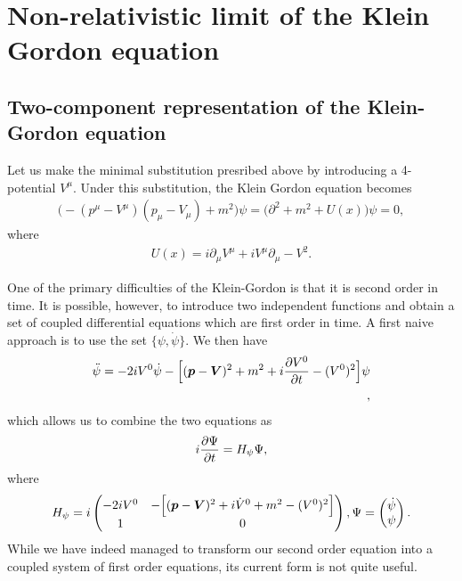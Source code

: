 \section{Non-relativistic limit of the Klein Gordon equation}
\label{sec:nr-limit-of-the-kg-equation}


\subsection{Two-component representation of the Klein-Gordon equation}

Let us make the minimal substitution presribed above by introducing a 4-potential $V^{\mu}$.
Under this substitution, the Klein Gordon equation becomes
\begin{align}
    \Big( - ( p^{\mu} - V^{\mu} ) ( p_{\mu} - V_{\mu} ) + m^2 \Big) \psi = \Big( \partial^2 + m^2 + U(x) \Big) \psi = 0
,\end{align}
where 
\begin{align}
    U(x) = i \partial_{\mu} V^{\mu} + i V^{\mu} \partial_{\mu} - V^2
.\end{align}

One of the primary difficulties of the Klein-Gordon is that it is second order in time.
It is possible, however, to introduce two independent functions and obtain a set of coupled differential equations which are first order in time.
A first naive approach is to use the set $\{ \psi,\dot{\psi} \}$.
We then have
\begin{align}
    \ddot{\psi} = - 2 i V^{0} \dot{\psi} - \Big[ (\vb*{p} - \vb*{V})^2 + m^2 + i \pdv{V^{0}}{t} - (V^{0})^2 \Big] \psi \\
,\end{align}
which allows us to combine the two equations as
\begin{align}
    i \pdv{\Psi}{t} = H_{\psi} \Psi
,\end{align}
where
\begin{align}
    H_{\psi} = i
    \begin{pmatrix}
        -2 i V^{0} & - \Big[ (\vb*{p} - \vb*{V})^2 + i \dot{V}^{0} + m^2 - (V^{0})^2 \Big] \\
        1 & 0
    \end{pmatrix},
    \Psi = 
    \begin{pmatrix}
        \dot{\psi} \\ \psi
    \end{pmatrix}    
.\end{align}
While we have indeed managed to transform our second order equation into a coupled system of first order equations, its current form is not quite useful.

